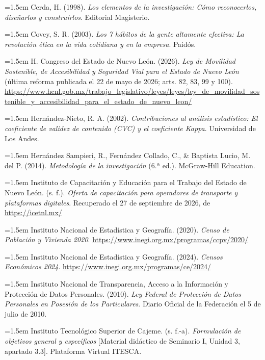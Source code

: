 {\hangindent=1.5em Cerda, H. (1998). \textit{Los elementos de la investigación: Cómo reconocerlos, diseñarlos y construirlos}. Editorial Magisterio.

\hangindent=1.5em Covey, S. R. (2003). \textit{Los 7 hábitos de la gente altamente efectiva: La revolución ética en la vida cotidiana y en la empresa}. Paidós.

\hangindent=1.5em H. Congreso del Estado de Nuevo León. (2026). \textit{Ley de Movilidad Sostenible, de Accesibilidad y Seguridad Vial para el Estado de Nuevo León} (última reforma publicada el 22 de mayo de 2026; arts. 82, 83, 99 y 100). \url{https://www.hcnl.gob.mx/trabajo_legislativo/leyes/leyes/ley_de_movilidad_sostenible_y_accesibilidad_para_el_estado_de_nuevo_leon/}

\hangindent=1.5em Hernández-Nieto, R. A. (2002). \textit{Contribuciones al análisis estadístico: El coeficiente de validez de contenido (CVC) y el coeficiente Kappa}. Universidad de Los Andes.

\hangindent=1.5em Hernández Sampieri, R., Fernández Collado, C., \& Baptista Lucio, M. del P. (2014). \textit{Metodología de la investigación} (6.ª ed.). McGraw-Hill Education.

\hangindent=1.5em Instituto de Capacitación y Educación para el Trabajo del Estado de Nuevo León. (s. f.). \textit{Oferta de capacitación para operadores de transporte y plataformas digitales}. Recuperado el 27 de septiembre de 2026, de \url{https://icetnl.mx/}

\hangindent=1.5em Instituto Nacional de Estadística y Geografía. (2020). \textit{Censo de Población y Vivienda 2020}. \url{https://www.inegi.org.mx/programas/ccpv/2020/}

\hangindent=1.5em Instituto Nacional de Estadística y Geografía. (2024). \textit{Censos Económicos 2024}. \url{https://www.inegi.org.mx/programas/ce/2024/}

\hangindent=1.5em Instituto Nacional de Transparencia, Acceso a la Información y Protección de Datos Personales. (2010). \textit{Ley Federal de Protección de Datos Personales en Posesión de los Particulares}. Diario Oficial de la Federación el 5 de julio de 2010.

\hangindent=1.5em Instituto Tecnológico Superior de Cajeme. (s. f.-a). \textit{Formulación de objetivos general y específicos} [Material didáctico de Seminario I, Unidad 3, apartado 3.3]. Plataforma Virtual ITESCA.

}
